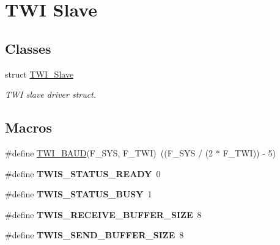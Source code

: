 \hypertarget{group__group__xmega__drivers__twi__twis}{\section{T\-W\-I Slave}
\label{group__group__xmega__drivers__twi__twis}
}
\subsection*{Classes}
\begin{DoxyCompactItemize}
\item 
struct \hyperlink{struct_t_w_i___slave}{T\-W\-I\-\_\-\-Slave}
\begin{DoxyCompactList}\small\item\em T\-W\-I slave driver struct. \end{DoxyCompactList}\end{DoxyCompactItemize}
\subsection*{Macros}
\begin{DoxyCompactItemize}
\item 
\#define \hyperlink{group__group__xmega__drivers__twi__twis_gaf373fdbc2054cf1a070ba2a24ddaedf3}{T\-W\-I\-\_\-\-B\-A\-U\-D}(F\-\_\-\-S\-Y\-S, F\-\_\-\-T\-W\-I)~((F\-\_\-\-S\-Y\-S / (2 $\ast$ F\-\_\-\-T\-W\-I)) -\/ 5)
\item 
\hypertarget{group__group__xmega__drivers__twi__twis_ga29a0dd867f9750813df434b03a538243}{\#define {\bfseries T\-W\-I\-S\-\_\-\-S\-T\-A\-T\-U\-S\-\_\-\-R\-E\-A\-D\-Y}~0}\label{group__group__xmega__drivers__twi__twis_ga29a0dd867f9750813df434b03a538243}

\item 
\hypertarget{group__group__xmega__drivers__twi__twis_ga72007cf9dc0aa3fc2c8ff81115d3a425}{\#define {\bfseries T\-W\-I\-S\-\_\-\-S\-T\-A\-T\-U\-S\-\_\-\-B\-U\-S\-Y}~1}\label{group__group__xmega__drivers__twi__twis_ga72007cf9dc0aa3fc2c8ff81115d3a425}

\item 
\hypertarget{group__group__xmega__drivers__twi__twis_gae04807263061939fbe5605b438458fd0}{\#define {\bfseries T\-W\-I\-S\-\_\-\-R\-E\-C\-E\-I\-V\-E\-\_\-\-B\-U\-F\-F\-E\-R\-\_\-\-S\-I\-Z\-E}~8}\label{group__group__xmega__drivers__twi__twis_gae04807263061939fbe5605b438458fd0}

\item 
\hypertarget{group__group__xmega__drivers__twi__twis_ga9485472cdd2d9d40bbe1a29df42310ab}{\#define {\bfseries T\-W\-I\-S\-\_\-\-S\-E\-N\-D\-\_\-\-B\-U\-F\-F\-E\-R\-\_\-\-S\-I\-Z\-E}~8}\label{group__group__xmega__drivers__twi__twis_ga9485472cdd2d9d40bbe1a29df42310ab}

\end{DoxyCompactItemize}
